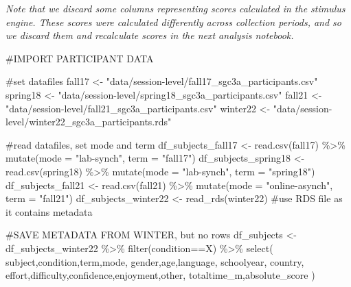 \documentclass[
  letterpaper,
  DIV=11,
  numbers=noendperiod]{scrreprt}
\newenvironment{Shaded}{\begin{snugshade}}{\end{snugshade}}
\newcommand{\AttributeTok}[1]{\textcolor[rgb]{0.40,0.45,0.13}{#1}}
\newcommand{\CommentTok}[1]{\textcolor[rgb]{0.37,0.37,0.37}{#1}}
\newcommand{\FunctionTok}[1]{\textcolor[rgb]{0.28,0.35,0.67}{#1}}
\newcommand{\NormalTok}[1]{\textcolor[rgb]{0.00,0.23,0.31}{#1}}
\newcommand{\OtherTok}[1]{\textcolor[rgb]{0.00,0.23,0.31}{#1}}
\newcommand{\SpecialCharTok}[1]{\textcolor[rgb]{0.37,0.37,0.37}{#1}}
\newcommand{\StringTok}[1]{\textcolor[rgb]{0.13,0.47,0.30}{#1}}
\begin{document}
\emph{Note that we discard some columns representing scores calculated
in the stimulus engine. These scores were calculated differently across
collection periods, and so we discard them and recalculate scores in the
next analysis notebook.}

\begin{Shaded}
\begin{Highlighting}[]
\CommentTok{\#IMPORT PARTICIPANT DATA}

\CommentTok{\#set datafiles}
\NormalTok{fall17 }\OtherTok{\textless{}{-}} \StringTok{"data/session{-}level/fall17\_sgc3a\_participants.csv"}
\NormalTok{spring18 }\OtherTok{\textless{}{-}} \StringTok{"data/session{-}level/spring18\_sgc3a\_participants.csv"}
\NormalTok{fall21 }\OtherTok{\textless{}{-}} \StringTok{"data/session{-}level/fall21\_sgc3a\_participants.csv"}
\NormalTok{winter22 }\OtherTok{\textless{}{-}} \StringTok{"data/session{-}level/winter22\_sgc3a\_participants.rds"}

\CommentTok{\#read datafiles, set mode and term}
\NormalTok{df\_subjects\_fall17 }\OtherTok{\textless{}{-}} \FunctionTok{read.csv}\NormalTok{(fall17) }\SpecialCharTok{\%\textgreater{}\%} \FunctionTok{mutate}\NormalTok{(}\AttributeTok{mode =} \StringTok{"lab{-}synch"}\NormalTok{, }\AttributeTok{term =} \StringTok{"fall17"}\NormalTok{)}
\NormalTok{df\_subjects\_spring18 }\OtherTok{\textless{}{-}} \FunctionTok{read.csv}\NormalTok{(spring18) }\SpecialCharTok{\%\textgreater{}\%} \FunctionTok{mutate}\NormalTok{(}\AttributeTok{mode =} \StringTok{"lab{-}synch"}\NormalTok{, }\AttributeTok{term =} \StringTok{"spring18"}\NormalTok{)}
\NormalTok{df\_subjects\_fall21 }\OtherTok{\textless{}{-}} \FunctionTok{read.csv}\NormalTok{(fall21) }\SpecialCharTok{\%\textgreater{}\%} \FunctionTok{mutate}\NormalTok{(}\AttributeTok{mode =} \StringTok{"online{-}asynch"}\NormalTok{, }\AttributeTok{term =} \StringTok{"fall21"}\NormalTok{)}
\NormalTok{df\_subjects\_winter22 }\OtherTok{\textless{}{-}} \FunctionTok{read\_rds}\NormalTok{(winter22) }\CommentTok{\#use RDS file as it contains metadata}

\CommentTok{\#SAVE METADATA FROM WINTER, but no rows }
\NormalTok{df\_subjects }\OtherTok{\textless{}{-}}\NormalTok{ df\_subjects\_winter22 }\SpecialCharTok{\%\textgreater{}\%} \FunctionTok{filter}\NormalTok{(condition}\SpecialCharTok{==}\StringTok{\textquotesingle{}X\textquotesingle{}}\NormalTok{) }\SpecialCharTok{\%\textgreater{}\%} \FunctionTok{select}\NormalTok{(}
\NormalTok{  subject,condition,term,mode,}
\NormalTok{  gender,age,language, schoolyear, country,}
\NormalTok{  effort,difficulty,confidence,enjoyment,other,}
\NormalTok{  totaltime\_m,absolute\_score}
\NormalTok{)}


\end{Highlighting}
\end{Shaded}
\end{document}
